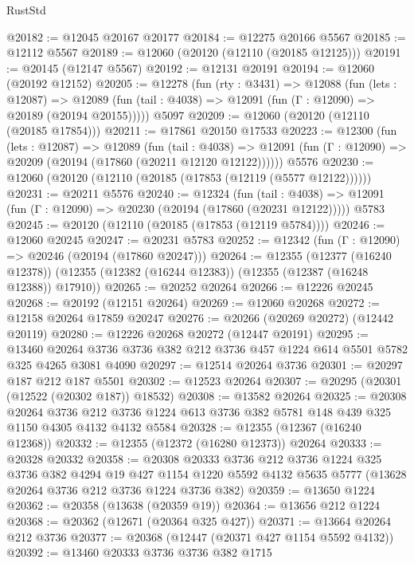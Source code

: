\begin{lexlean}{RustStd}
\begin{coremodule}
@20182 := @12045 @20167 @20177
@20184 := @12275 @20166 @5567
@20185 := @12112 @5567
@20189 := @12060 (@20120 (@12110 (@20185 @12125)))
@20191 := @20145 (@12147 @5567)
@20192 := @12131 @20191
@20194 := @12060 (@20192 @12152)
@20205 := @12278
    (fun (rty : @3431) =>
    @12088
      (fun (lets : @12087) =>
      @12089 (fun (tail : @4038) => @12091 (fun (Γ : @12090) => @20189 (@20194 @20155)))))
    @5097
@20209 := @12060 (@20120 (@12110 (@20185 @17854)))
@20211 := @17861 @20150 @17533
@20223 := @12300
    (fun (lets : @12087) =>
    @12089
      (fun (tail : @4038) =>
      @12091 (fun (Γ : @12090) => @20209 (@20194 (@17860 (@20211 @12120 @12122))))))
    @5576
@20230 := @12060 (@20120 (@12110 (@20185 (@17853 (@12119 (@5577 @12122))))))
@20231 := @20211 @5576
@20240 := @12324
    (fun (tail : @4038) => @12091 (fun (Γ : @12090) => @20230 (@20194 (@17860 (@20231 @12122)))))
    @5783
@20245 := @20120 (@12110 (@20185 (@17853 (@12119 @5784))))
@20246 := @12060 @20245
@20247 := @20231 @5783
@20252 := @12342 (fun (Γ : @12090) => @20246 (@20194 (@17860 @20247)))
@20264 := @12355
    (@12377 (@16240 @12378))
    (@12355 (@12382 (@16244 @12383)) (@12355 (@12387 (@16248 @12388)) @17910))
@20265 := @20252 @20264
@20266 := @12226 @20245
@20268 := @20192 (@12151 @20264)
@20269 := @12060 @20268
@20272 := @12158 @20264 @17859 @20247
@20276 := @20266 (@20269 @20272) (@12442 @20119)
@20280 := @12226 @20268 @20272 (@12447 @20191)
@20295 := @13460
    @20264
    @3736
    @3736
    @382
    @212
    @3736
    @457
    @1224
    @614
    @5501
    @5782
    @325
    @4265
    @3081
    @4090
@20297 := @12514 @20264 @3736
@20301 := @20297 @187 @212 @187 @5501
@20302 := @12523 @20264
@20307 := @20295 (@20301 (@12522 (@20302 @187)) @18532)
@20308 := @13582 @20264
@20325 := @20308
    @20264
    @3736
    @212
    @3736
    @1224
    @613
    @3736
    @382
    @5781
    @148
    @439
    @325
    @1150
    @4305
    @4132
    @4132
    @5584
@20328 := @12355 (@12367 (@16240 @12368))
@20332 := @12355 (@12372 (@16280 @12373)) @20264
@20333 := @20328 @20332
@20358 := @20308
    @20333
    @3736
    @212
    @3736
    @1224
    @325
    @3736
    @382
    @4294
    @19
    @427
    @1154
    @1220
    @5592
    @4132
    @5635
    @5777
    (@13628 @20264 @3736 @212 @3736 @1224 @3736 @382)
@20359 := @13650 @1224
@20362 := @20358 (@13638 (@20359 @19))
@20364 := @13656 @212 @1224
@20368 := @20362 (@12671 (@20364 @325 @427))
@20371 := @13664 @20264 @212 @3736
@20377 := @20368 (@12447 (@20371 @427 @1154 @5592 @4132))
@20392 := @13460
    @20333
    @3736
    @3736
    @382
    @1715

\end{coremodule}
\end{lexlean}
